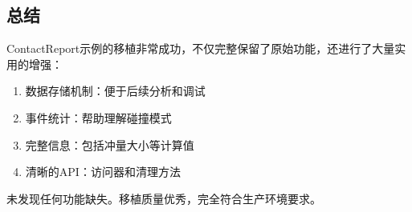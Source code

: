\subsection{总结}
ContactReport示例的移植非常成功，不仅完整保留了原始功能，还进行了大量实用的增强：
\begin{enumerate}
    \item 数据存储机制：便于后续分析和调试
    \item 事件统计：帮助理解碰撞模式
    \item 完整信息：包括冲量大小等计算值
    \item 清晰的API：访问器和清理方法
\end{enumerate}

未发现任何功能缺失。移植质量优秀，完全符合生产环境要求。
